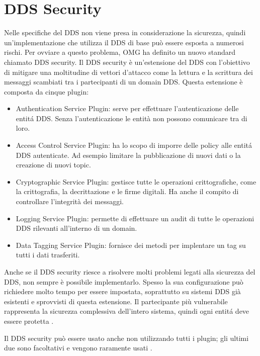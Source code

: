 \section{DDS Security}
Nelle specifiche del DDS non viene presa in considerazione la sicurezza, quindi
un'implementazione che utilizza il DDS di base può essere esposta a numerosi 
rischi. Per ovviare a questo problema, OMG ha definito un nuovo standard 
chiamato DDS security. Il DDS security è un'estensione del DDS con 
l'obiettivo di mitigare una moltitudine di vettori d'attacco come 
la lettura e la scrittura dei messaggi scambiati tra i partecipanti di un 
domain DDS. Questa estensione è composta da cinque plugin:
\begin{itemize}
    \item Authentication Service Plugin: serve per effettuare l'autenticazione 
    delle entitá DDS. Senza l'autenticazione le entità non possono
    comunicare tra di loro.
    \item Access Control Service Plugin: ha lo scopo di imporre 
    delle policy alle entitá DDS autenticate. Ad esempio limitare
    la pubblicazione di nuovi dati o la creazione di nuovi topic.
    \item Cryptographic Service Plugin: gestisce tutte le operazioni 
    crittografiche, come la crittografia, la decrittazione e
    le firme digitali. Ha anche il compito di controllare l'integrità
    dei messaggi.
    \item Logging Service Plugin: permette di effettuare un audit di 
    tutte le operazioni DDS rilevanti all'interno di un domain.
    \item Data Tagging Service Plugin: fornisce dei metodi per implentare
    un tag su tutti i dati trasferiti. 
\end{itemize}
Anche se il DDS security riesce a risolvere molti problemi legati alla
sicurezza del DDS, non sempre è possibile implementarlo. Spesso 
la sua configurazione può richiedere molto tempo per essere 
impostata, soprattutto su sistemi DDS già esistenti e sprovvisti di 
questa estensione.
Il partecipante più vulnerabile rappresenta la sicurezza
complessiva dell'intero sistema, quindi ogni entitá deve essere
protetta \cite{Michaud2017Apr}. 

Il DDS security può essere usato anche non utilizzando tutti i plugin;
gli ultimi due sono facoltativi e vengono 
raramente usati \cite{essay93639}. 
\label{DDS Security}


